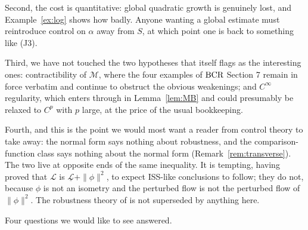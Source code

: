 \documentclass[11pt]{article}
\theoremstyle{plain}
\theoremstyle{definition}
\theoremstyle{remark}
\newcommand{\M}{\mathcal{M}}
\newcommand{\bcr}{\textup{BCR}}
\begin{document}
Second, the cost is quantitative: global quadratic growth is genuinely lost, and
Example~\ref{ex:log} shows how badly. Anyone wanting a global estimate must
reintroduce control on $\alpha$ away from $S$, at which point one is back to
something like (J3).

Third, we have not touched the two hypotheses that \cite{BCR2026} itself flags
as the interesting ones: contractibility of $\M$, where the four examples of
$\bcr$ Section 7 remain in force verbatim and continue to obstruct the obvious
weakenings; and $C^\infty$ regularity, which enters through
\cite{RB2024a} in Lemma~\ref{lem:MB} and could presumably be relaxed to $C^p$
with $p$ large, at the price of the usual bookkeeping.

Fourth, and this is the point we would most want a reader from control theory to
take away: the normal form says nothing about robustness, and the
comparison-function class says nothing about the normal form
(Remark~\ref{rem:transverse}). The two live at opposite ends of the same
inequality. It is tempting, having proved that $\mathcal{L}$ is
$\underline{\mathcal{L}}+\|\phi\|^2$, to expect ISS-like conclusions to follow;
they do not, because $\phi$ is not an isometry and the perturbed flow is not the
perturbed flow of $\|\phi\|^2$. The robustness theory of \cite{Sontag2025L4DC,
CuiJiangSontag2024, CuiJiangSontag2026} is not superseded by anything here.

Four questions we would like to see answered.
\end{document}
